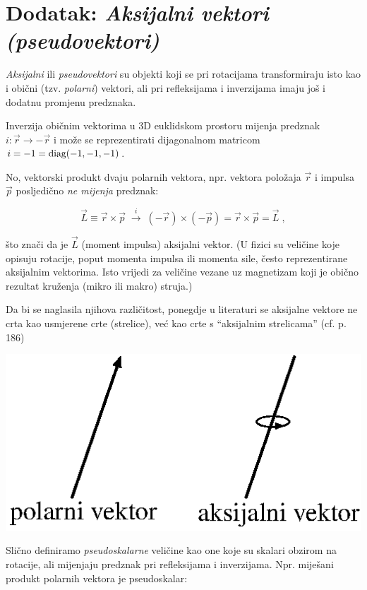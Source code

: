 \section{Dodatak: \emph{Aksijalni vektori (pseudovektori)} \label{sec:aksijalni}}
\label{sec:pseudovektori}

\emph{Aksijalni} ili \emph{pseudovektori} su objekti koji se pri rotacijama transformiraju
isto kao i obični (tzv. \emph{polarni}) vektori, ali pri refleksijama i inverzijama
imaju još i dodatnu promjenu predznaka.

Inverzija običnim vektorima u 3D euklidskom prostoru mijenja
predznak $i: \vec{r} \to - \vec{r}$ i može se reprezentirati dijagonalnom
matricom $i = -1 = {\rm diag}(-1, -1, -1)$. 

No, vektorski produkt dvaju polarnih vektora, npr. vektora položaja $\vec{r}$
i impulsa $\vec{p}$ posljedično \emph{ne mijenja} predznak:

\[  \vec{L}\equiv \vec{r}\times\vec{p} \; \stackrel{i}{\longrightarrow} \;
  (-\vec{r}) \times (-\vec{p}) =  \vec{r}\times\vec{p} = \vec{L}  \;,
\]

što znači da je $\vec{L}$ (moment impulsa) aksijalni vektor. (U fizici su
veličine koje opisuju rotacije, poput momenta impulsa ili momenta sile, 
često reprezentirane aksijalnim vektorima. Isto vrijedi za veličine
vezane uz magnetizam koji je obično rezultat kruženja (mikro ili makro) struja.)

Da bi se naglasila njihova različitost,
ponegdje u literaturi se aksijalne vektore ne crta kao usmjerene crte
(strelice), već kao crte s ``aksijalnim strelicama'' (cf. 
\cite{Bronstejn:2004} p. 186)

\centerline{\includegraphics[scale=0.8]{pics/aksijalni_vektor.eps}}

Slično definiramo \emph{pseudoskalarne} veličine kao one koje su skalari
obzirom na rotacije, ali mijenjaju predznak pri refleksijama i inverzijama.
Npr. miješani produkt polarnih vektora je pseudoskalar:

